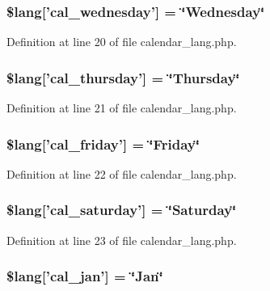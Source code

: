 \subsubsection[{\$lang}]{\setlength{\rightskip}{0pt plus 5cm}\$lang['cal\-\_\-wednesday'] = \char`\"{}Wednesday\char`\"{}}\label{calendar__lang_8php_a85c82aef005144770cf7356945a85819}


Definition at line 20 of file calendar\-\_\-lang.\-php.

\subsubsection[{\$lang}]{\setlength{\rightskip}{0pt plus 5cm}\$lang['cal\-\_\-thursday'] = \char`\"{}Thursday\char`\"{}}\label{calendar__lang_8php_a3ab3ea291fddc8063b57a25cfbc7cf0f}


Definition at line 21 of file calendar\-\_\-lang.\-php.

\subsubsection[{\$lang}]{\setlength{\rightskip}{0pt plus 5cm}\$lang['cal\-\_\-friday'] = \char`\"{}Friday\char`\"{}}\label{calendar__lang_8php_a5be751a9260fe00120263d6e1f41de8c}


Definition at line 22 of file calendar\-\_\-lang.\-php.

\subsubsection[{\$lang}]{\setlength{\rightskip}{0pt plus 5cm}\$lang['cal\-\_\-saturday'] = \char`\"{}Saturday\char`\"{}}\label{calendar__lang_8php_aff3fc79a60ccf1f09bfe1f4387105c4b}


Definition at line 23 of file calendar\-\_\-lang.\-php.

\subsubsection[{\$lang}]{\setlength{\rightskip}{0pt plus 5cm}\$lang['cal\-\_\-jan'] = \char`\"{}Jan\char`\"{}}\label{calendar__lang_8php_a830b34d4425cdab2632056ef2860de62}



